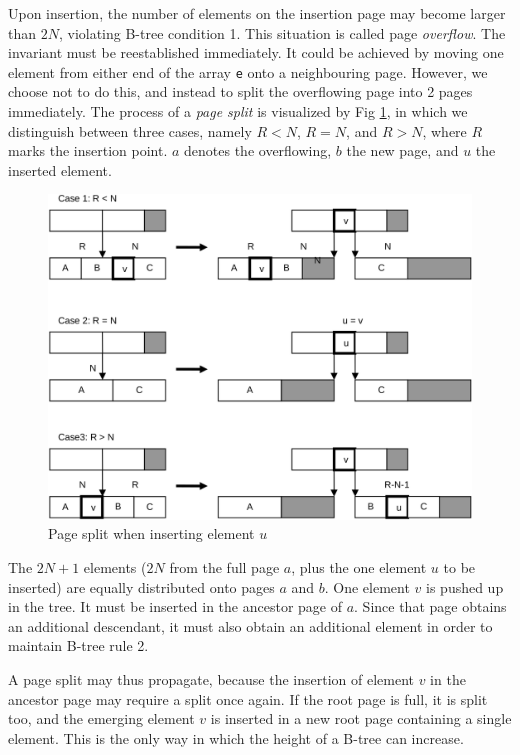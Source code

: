 Upon insertion, the number of elements on the insertion page may become larger than $2N$, violating
B-tree condition 1. This situation is called page \emph{overflow}. The invariant must be reestablished
immediately. It could be achieved by moving one element from either end of the array \verb|e| onto a
neighbouring page. However, we choose not to do this, and instead to split the overflowing page into 2
pages immediately. The process of a \emph{page split} is visualized by Fig \ref{fig:page-split},
in which we distinguish between three cases, namely $R < N$, $R = N$, and $R > N$, where $R$ marks
the insertion point. $a$ denotes the overflowing, $b$ the new page, and $u$ the inserted element.
\begin{figure}
  \label{fig:page-split}
  \centering
  \includegraphics[width=.95\textwidth]{i/o}
  \caption{Page split when inserting element $u$}
\end{figure}

The $2N + 1$ elements ($2N$ from the full page $a$, plus the one element $u$ to be inserted) are equally
distributed onto pages $a$ and $b$. One element $v$ is pushed up in the tree. It must be inserted in the
ancestor page of $a$. Since that page obtains an additional descendant, it must also obtain an
additional element in order to maintain B-tree rule 2.

A page split may thus propagate, because the insertion of element $v$ in the ancestor page may
require a split once again. If the root page is full, it is split too, and the emerging element $v$ is
inserted in a new root page containing a single element. This is the only way in which the height
of a B-tree can increase.

